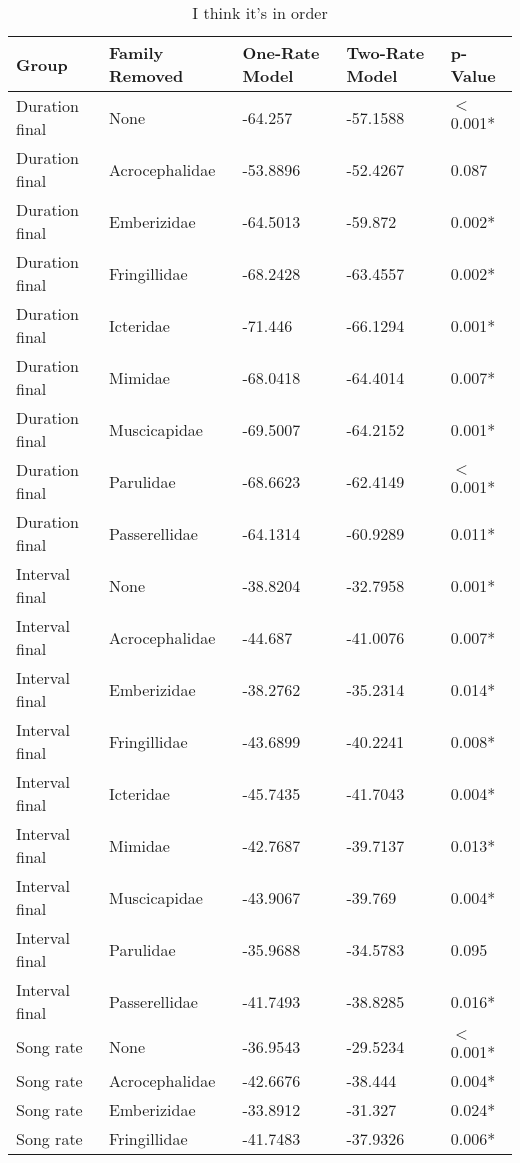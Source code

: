 \documentclass{article}\usepackage[]{graphicx}\usepackage[]{color}
\begin{document}
\begin{table}[ht]
\centering
\caption{I think it's in order}
\begin{tabular}{lllll}
  \hline
Group & Family Removed & One-Rate Model & Two-Rate Model & p-Value \\ 
  \hline
Duration final & None & -64.257 & -57.1588 & $<$0.001* \\ 
  Duration final & Acrocephalidae & -53.8896 & -52.4267 & 0.087 \\ 
  Duration final & Emberizidae & -64.5013 & -59.872 & 0.002* \\ 
  Duration final & Fringillidae & -68.2428 & -63.4557 & 0.002* \\ 
  Duration final & Icteridae & -71.446 & -66.1294 & 0.001* \\ 
  Duration final & Mimidae & -68.0418 & -64.4014 & 0.007* \\ 
  Duration final & Muscicapidae & -69.5007 & -64.2152 & 0.001* \\ 
  Duration final & Parulidae & -68.6623 & -62.4149 & $<$0.001* \\ 
  Duration final & Passerellidae & -64.1314 & -60.9289 & 0.011* \\ 
  Interval final & None & -38.8204 & -32.7958 & 0.001* \\ 
  Interval final & Acrocephalidae & -44.687 & -41.0076 & 0.007* \\ 
  Interval final & Emberizidae & -38.2762 & -35.2314 & 0.014* \\ 
  Interval final & Fringillidae & -43.6899 & -40.2241 & 0.008* \\ 
  Interval final & Icteridae & -45.7435 & -41.7043 & 0.004* \\ 
  Interval final & Mimidae & -42.7687 & -39.7137 & 0.013* \\ 
  Interval final & Muscicapidae & -43.9067 & -39.769 & 0.004* \\ 
  Interval final & Parulidae & -35.9688 & -34.5783 & 0.095 \\ 
  Interval final & Passerellidae & -41.7493 & -38.8285 & 0.016* \\ 
  Song rate & None & -36.9543 & -29.5234 & $<$0.001* \\ 
  Song rate & Acrocephalidae & -42.6676 & -38.444 & 0.004* \\ 
  Song rate & Emberizidae & -33.8912 & -31.327 & 0.024* \\ 
  Song rate & Fringillidae & -41.7483 & -37.9326 & 0.006* \\ 

\end{tabular}
\end{table}
\end{document}

